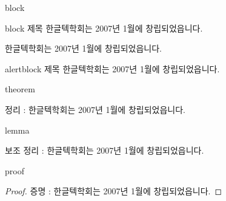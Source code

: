 \documentclass[10pt,blue,xcolor=pdftex,dvipsnames,table,handout]{beamer}
\begin{document}

		\begin{frame}[t]{block}

			\begin{block} {block 제목}
			한글텍학회는 2007년 1월에 창립되었읍니다.	
			\end{block}

			\begin{example}
			한글텍학회는 2007년 1월에 창립되었읍니다.	
			\end{example}

			\begin{alertblock} {alertblock 제목}
			한글텍학회는 2007년 1월에 창립되었읍니다.	
			\end{alertblock}

		\end{frame}

		\begin{frame}[t]{theorem}
			\begin{theorem}
			정리 : 한글텍학회는 2007년 1월에 창립되었읍니다.	
			\end{theorem}
		\end{frame}

		\begin{frame}[t]{lemma}

			\begin{lemma}
			보조 정리 :  한글텍학회는 2007년 1월에 창립되었읍니다.	
			\end{lemma}

		\end{frame}


		\begin{frame}[t]{proof}

			\begin{proof}
			증명 : 한글텍학회는 2007년 1월에 창립되었읍니다.	
			\end{proof}

		\end{frame}
\end{document}
